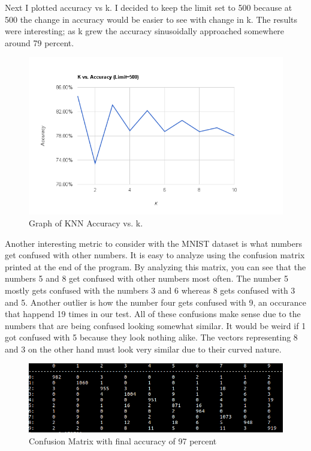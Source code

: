 \documentclass{article}
\begin{document}
Next I plotted accuracy vs k. I decided to keep the limit set to 500 because at 500 the change in accuracy would be easier to see with change in k. The results were interesting; as k grew the accuracy sinusoidally approached somewhere around 79 percent.

\begin{figure}[!ht]

  \caption{Graph of KNN Accuracy vs. k.}
  \includegraphics[width=\columnwidth]{k.png}

\end{figure}

Another interesting metric to consider with the MNIST dataset is what numbers get confused with other numbers. It is easy to analyze using the confusion matrix printed at the end of the program. By analyzing this matrix, you can see that the numbers 5 and 8 get confused with other numbers most often. The number 5 mostly gets confused with the numbers 3 and 6 whereas 8 gets confused with 3 and 5. Another outlier is how the number four gets confused with 9, an occurance that happend 19 times in our test. All of these confusions make sense due to the numbers that are being confused looking somewhat similar. It would be weird if 1 got confused with 5 because they look nothing alike. The vectors representing 8 and 3 on the other hand must look very similar due to their curved nature.

\begin{figure}[!ht]

  \caption{Confusion Matrix with final accuracy of 97 percent}
  \includegraphics[width=\columnwidth]{ConfusionMatrix.png}

\end{figure}
\end{document}
